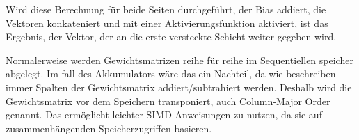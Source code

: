Wird diese Berechnung für beide Seiten durchgeführt, der Bias addiert, die Vektoren konkateniert und mit einer Aktivierungsfunktion aktiviert, ist das Ergebnis, der Vektor, der an die erste versteckte Schicht weiter gegeben wird.

Normalerweise werden Gewichtsmatrizen reihe für reihe im Sequentiellen speicher abgelegt. Im fall des Akkumulators wäre das ein Nachteil, da wie beschreiben immer Spalten der Gewichtsmatrix addiert/subtrahiert werden. Deshalb wird die Gewichtsmatrix vor dem Speichern transponiert, auch Column-Major Order genannt. Das ermöglicht leichter \ac{SIMD} Anweisungen zu nutzen, da sie auf zusammenhängenden Speicherzugriffen basieren.